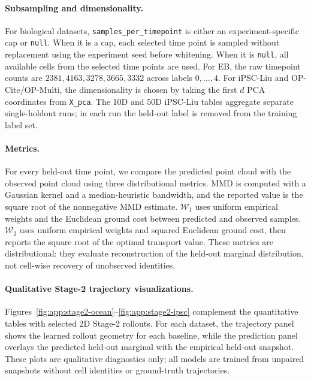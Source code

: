 \paragraph{Subsampling and dimensionality.}
For biological datasets, \texttt{samples\_per\_timepoint} is either an experiment-specific cap or \texttt{null}. When it is a cap, each selected time point is sampled without replacement using the experiment seed before whitening. When it is \texttt{null}, all available cells from the selected time points are used. For EB, the raw timepoint counts are $2381,4163,3278,3665,3332$ across labels $0,\ldots,4$. For iPSC-Liu and OP-Cite/OP-Multi, the dimensionality is chosen by taking the first $d$ PCA coordinates from \texttt{X\_pca}. The 10D and 50D iPSC-Liu tables aggregate separate single-holdout runs; in each run the held-out label is removed from the training label set.

\paragraph{Metrics.}
For every held-out time point, we compare the predicted point cloud with the observed point cloud using three distributional metrics. MMD is computed with a Gaussian kernel and a median-heuristic bandwidth, and the reported value is the square root of the nonnegative MMD estimate. $\mathcal{W}_1$ uses uniform empirical weights and the Euclidean ground cost between predicted and observed samples. $\mathcal{W}_2$ uses uniform empirical weights and squared Euclidean ground cost, then reports the square root of the optimal transport value. These metrics are distributional: they evaluate reconstruction of the held-out marginal distribution, not cell-wise recovery of unobserved identities.



\vspace{0.75em}


\vspace{0.75em}


\clearpage
\paragraph{Qualitative Stage-2 trajectory visualizations.}
Figures~\ref{fig:app:stage2-ocean}--\ref{fig:app:stage2-ipsc} complement the quantitative tables with selected 2D Stage-2 rollouts. For each dataset, the trajectory panel shows the learned rollout geometry for each baseline, while the prediction panel overlays the predicted held-out marginal with the empirical held-out snapshot. These plots are qualitative diagnostics only; all models are trained from unpaired snapshots without cell identities or ground-truth trajectories.

